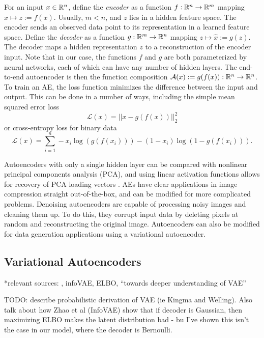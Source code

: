 For an input $x \in \mathbb{R}^n$, define the \textit{encoder} as a function $f: \mathbb{R}^n \to \mathbb{R}^m$ mapping $x \mapsto z := f(x)$. Usually, $m < n$, and $z$ lies in a hidden feature space. The encoder sends an observed data point to its representation in a learned feature space. Define the \textit{decoder} as a function $g: \mathbb{R}^m \to \mathbb{R}^n$ mapping $z \mapsto \hat x := g(z)$. The decoder maps a hidden representation $z$ to a reconstruction of the encoder input. Note that in our case, the functions $f$ and $g$ are both parameterized by neural networks, each of which can have any number of hidden layers. The end-to-end autoencoder is then the function composition $\mathcal{A}(x):= g(f(x)): \mathbb{R}^n \to \mathbb{R}^n$. To train an AE, the loss function minimizes the difference between the input and output. This can be done in a number of ways, including the simple mean squared error loss
\begin{equation}
  \mathcal{L}(x) = || x - g(f(x))||_2^2
  \label{eq:mse}
\end{equation}
or cross-entropy loss for binary data
\begin{equation}
  \mathcal{L}(x) = \sum_{i=1}^n - x_i \log(g(f(x_i))) - (1-x_i)\log(1- g(f(x_i))).
  \label{eq:cross_entropy}
\end{equation}

Autoencoders with only a single hidden layer can be compared with nonlinear principal components analysis (PCA), and using linear activation functions allows for recovery of PCA loading vectors \cite{plaut2018}. AEs have clear applications in image compression straight out-of-the-box, and can be modified for more complicated problems. Denoising autoencoders \cite{vincent2008} are capable of processing noisy images and cleaning them up. To do this, they corrupt input data by deleting pixels at random and reconstructing the original image. Autoencoders can also be modified for data generation applications using a variational autoencoder.

\subsection{Variational Autoencoders}
*relevant sources: \cite{doersch2016} \cite{kingma2014} \cite{Bleia2017}, infoVAE, ELBO, ``towards deeper understanding of VAE''

TODO: describe probabilistic derivation of VAE (ie Kingma and Welling). Also talk about how Zhao et al (InfoVAE) show that if decoder is Gaussian, then maximizing ELBO makes the latent distribution bad - bu I've shown this isn't the case in our model, where the decoder is Bernoulli.

